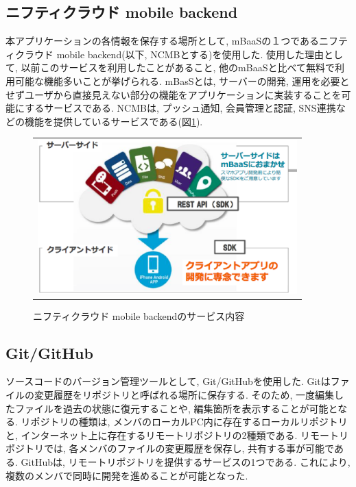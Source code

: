 \subsection{ニフティクラウド mobile backend}%
本アプリケーションの各情報を保存する場所として, mBaaSの１つであるニフティクラウド mobile backend(以下, NCMBとする)を使用した. 使用した理由として, 以前このサービスを利用したことがあること, 他のmBaaSと比べて無料で利用可能な機能多いことが挙げられる. mBasSとは, サーバーの開発, 運用を必要とせずユーザから直接見えない部分の機能をアプリケーションに実装することを可能にするサービスである\cite{about_mbaas}. NCMBは, プッシュ通知, 会員管理と認証, SNS連携などの機能\cite{price_mbaas}を提供しているサービスである(図\ref{fig:image_mbaas}).

\begin{figure}[htbp]
  \begin{center}
    \begin{tabular}{c}

      \begin{minipage}{0.7\hsize}
        \begin{center}
\includegraphics[width=10cm]{ncmb_overview.eps}
          \hspace{1cm} %
        \end{center}
      \end{minipage}

    \end{tabular}
    \caption{ニフティクラウド mobile backendのサービス内容\cite{intro_mbaas}}
    \label{fig:image_mbaas}
  \end{center}
\end{figure}


\subsection{Git/GitHub}%
ソースコードのバージョン管理ツールとして, Git/GitHubを使用した. Gitはファイルの変更履歴をリポジトリと呼ばれる場所に保存する. そのため, 一度編集したファイルを過去の状態に復元することや, 編集箇所を表示することが可能となる\cite{book_about_github}. リポジトリの種類は, メンバのローカルPC内に存在するローカルリポジトリと, インターネット上に存在するリモートリポジトリの2種類である\cite{monkey_git}. リモートリポジトリでは, 各メンバのファイルの変更履歴を保存し, 共有する事が可能である. GitHubは, リモートリポジトリを提供するサービスの1つである. これにより, 複数のメンバで同時に開発を進めることが可能となった.


